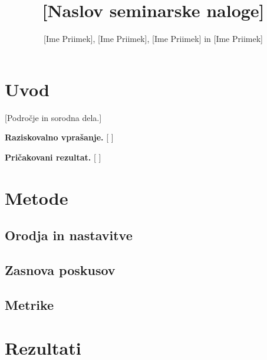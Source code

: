 
\graphicspath{{Skupina02/img/}}

\title{[Naslov seminarske naloge]}
\author{[Ime Priimek], [Ime Priimek], [Ime Priimek] in [Ime Priimek]}
\maketitle


\section{Uvod}
\label{g02:sec:uvod}

[Področje in sorodna dela.]

\begin{svgraybox}
\textbf{Raziskovalno vprašanje.} [ ]

\textbf{Pričakovani rezultat.} [ ]
\end{svgraybox}

\section{Metode}
\label{g02:sec:metode}

\subsection{Orodja in nastavitve}
\label{g02:sec:orodja}

\subsection{Zasnova poskusov}
\label{g02:sec:poskusi}

\subsection{Metrike}
\label{g02:sec:metrike}

\section{Rezultati}
\label{g02:sec:rezultati}

